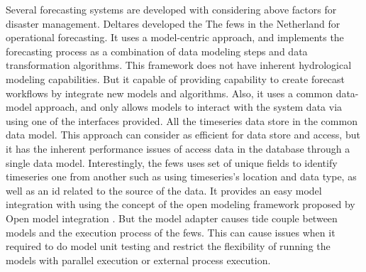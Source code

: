 \documentclass[conference]{IEEEtran}
\newcommand{\db}[1]{\textcolor{blue!40}{#1}}
\begin{document}
\db{Several forecasting systems are} developed with considering above factors for disaster management. Deltares developed the The \acrfull{fews} \cite{Werner2013TheSystem} in the Netherland for operational forecasting. It uses a model-centric approach, and implements the forecasting process as a combination of data modeling steps and data transformation algorithms. This framework does not have inherent hydrological modeling capabilities. But it capable of providing capability to create forecast workflows by integrate new models and algorithms. Also, it uses a common data-model approach, and only allows models to interact with the system data via using one of the interfaces provided. All the timeseries data store in the common data model. This approach can consider as efficient for data store and access, but it has the inherent performance issues of access data in the database through a single data model. Interestingly, the \acrshort{fews} uses set of unique fields to identify timeseries one from another such as using timeseries's location and data type, as well as an id related to the source of the data. It provides an easy model integration with using the concept of the open modeling framework proposed by Open model integration \cite{Kokkonen2003InterfacingXML}. But the model adapter causes tide couple between models and the execution process of the \acrshort{fews}. This can cause issues when it required to do model unit testing and restrict the flexibility of running the models with parallel execution or external process execution.
\end{document}
